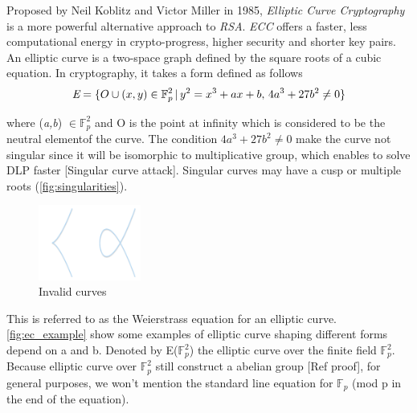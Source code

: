 Proposed by Neil Koblitz and Victor Miller in 1985, \emph{Elliptic Curve Cryptography} is a more powerful alternative approach to \emph{RSA}. \emph{ECC} offers a faster, less computational energy in crypto-progress, higher security and shorter key pairs.
An elliptic curve is a two-space graph defined by the square roots of a cubic equation. In cryptography, it takes a form defined as follows
\begin{equation}
  \emph{E} = \{{O}\cup{(x,y)\in \mathbb{F}_{p}^2 \,|\, y^2 = x^3 + ax + b, \, 4a^3 + 27b^2 \neq 0}\}
\end{equation}

where (\emph{a,b}) $\in\mathbb{F}_{p}^2$ and O is the point at infinity which is considered to be the neutral elementof the curve.
The condition $4a^3 + 27b^2 \neq 0$ make the curve not singular since it will be isomorphic to multiplicative group, which enables to solve DLP faster [Singular curve attack].
Singular curves may have a cusp or multiple roots (\autoref{fig:singularities}).

\begin{figure}[ht!]
  \centering
  \includegraphics[width=0.3\textwidth]{images/singularities.png}
  \caption[Invalid curves]{Invalid curves}
  \label{fig:singularities}
\end{figure}

This is referred to as the Weierstrass equation for an elliptic curve.
\autoref{fig:ec_example} show some examples of elliptic curve shaping different forms depend on a and b.
Denoted by E($\mathbb{F}_{p}^2$) the elliptic curve over the finite field $\mathbb{F}_{p}^2$.
Because elliptic curve over $\mathbb{F}_{p}^2$ still construct a abelian group [Ref proof], for general purposes, we won't mention the standard line equation for $\mathbb{F}_{p}$ (mod p in the end of the equation).


